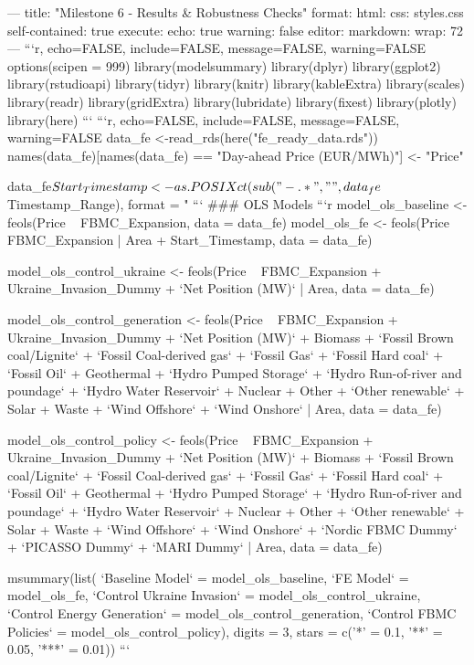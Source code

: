 ---
title: "Milestone 6 - Results & Robustness Checks"
format:
  html:
    css: styles.css
    self-contained: true
execute:
  echo: true
  warning: false
editor: 
  markdown: 
    wrap: 72
---
```{r, echo=FALSE, include=FALSE, message=FALSE, warning=FALSE}
options(scipen = 999)
library(modelsummary)
library(dplyr)
library(ggplot2)
library(rstudioapi)
library(tidyr)
library(knitr)
library(kableExtra)
library(scales)
library(readr)
library(gridExtra)
library(lubridate)
library(fixest)
library(plotly)
library(here)
```
```{r, echo=FALSE, include=FALSE, message=FALSE, warning=FALSE}
data_fe <-read_rds(here("fe_ready_data.rds"))
names(data_fe)[names(data_fe) == "Day-ahead Price (EUR/MWh)"] <- "Price"

data_fe$Start_Timestamp <- as.POSIXct(
  sub(" -.*", "", data_fe$Timestamp_Range),
  format = "%
```
### OLS Models
```{r}
model_ols_baseline <- feols(Price ~ FBMC_Expansion, data = data_fe)
model_ols_fe <- feols(Price ~ FBMC_Expansion | Area + Start_Timestamp, data = data_fe)
  
model_ols_control_ukraine <- feols(Price ~ FBMC_Expansion + Ukraine_Invasion_Dummy + `Net Position (MW)` | Area, data = data_fe)

model_ols_control_generation <- feols(Price ~ FBMC_Expansion + Ukraine_Invasion_Dummy + `Net Position (MW)` + Biomass + `Fossil Brown coal/Lignite` + `Fossil Coal-derived gas` + `Fossil Gas` + `Fossil Hard coal` + `Fossil Oil` + Geothermal + `Hydro Pumped Storage` + `Hydro Run-of-river and poundage` + `Hydro Water Reservoir` + Nuclear + Other + `Other renewable` + Solar + Waste + `Wind Offshore` + `Wind Onshore` | Area, data = data_fe)

model_ols_control_policy <- feols(Price ~ FBMC_Expansion + Ukraine_Invasion_Dummy + `Net Position (MW)` + Biomass + `Fossil Brown coal/Lignite` + `Fossil Coal-derived gas` + `Fossil Gas` + `Fossil Hard coal` + `Fossil Oil` + Geothermal + `Hydro Pumped Storage` + `Hydro Run-of-river and poundage` + `Hydro Water Reservoir` + Nuclear + Other + `Other renewable` + Solar + Waste + `Wind Offshore` + `Wind Onshore` + `Nordic FBMC Dummy` + `PICASSO Dummy` + `MARI Dummy` | Area, data = data_fe)

msummary(list(
    `Baseline Model` = model_ols_baseline,
    `FE Model` = model_ols_fe,
    `Control Ukraine Invasion` = model_ols_control_ukraine,
    `Control Energy Generation` = model_ols_control_generation,
    `Control FBMC Policies` = model_ols_control_policy),
  digits = 3,
  stars = c('*' = 0.1, '**' = 0.05, '***' = 0.01))
```

